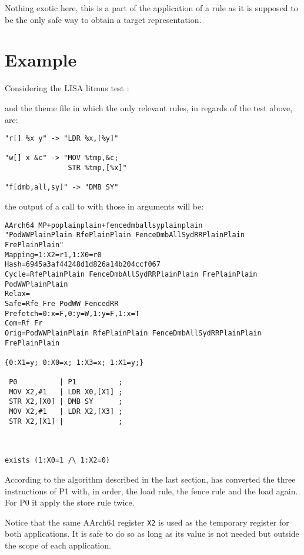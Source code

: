 Nothing exotic here, this is a part of the application of a rule as it is supposed
to be the only safe way to obtain a target representation.

\section{Example}

Considering the LISA litmus test
:

 

and the theme file  in which the
only relevant rules, in regards of the test above, are:

\begin{verbatim}
"r[] %x y" -> "LDR %x,[%y]"

"w[] x &c" -> "MOV %tmp,&c;
               STR %tmp,[%x]"

"f[dmb,all,sy]" -> "DMB SY"
\end{verbatim}

the output of a call to \jingle{} with those in arguments will be:
\begin{verbatim}
AArch64 MP+poplainplain+fencedmballsyplainplain
"PodWWPlainPlain RfePlainPlain FenceDmbAllSydRRPlainPlain FrePlainPlain"
Mapping=1:X2=r1,1:X0=r0
Hash=6945a3af44248d1d826a14b204ccf067
Cycle=RfePlainPlain FenceDmbAllSydRRPlainPlain FrePlainPlain PodWWPlainPlain
Relax=
Safe=Rfe Fre PodWW FencedRR
Prefetch=0:x=F,0:y=W,1:y=F,1:x=T
Com=Rf Fr
Orig=PodWWPlainPlain RfePlainPlain FenceDmbAllSydRRPlainPlain FrePlainPlain

{0:X1=y; 0:X0=x; 1:X3=x; 1:X1=y;}

 P0          | P1          ;
 MOV X2,#1   | LDR X0,[X1] ;
 STR X2,[X0] | DMB SY      ;
 MOV X2,#1   | LDR X2,[X3] ;
 STR X2,[X1] |             ;



exists (1:X0=1 /\ 1:X2=0)
\end{verbatim}

According to the algorithm described in the last section,
\jingle{} has converted the three instructions of P1 with,
in order, the load rule, the fence rule and the load again.
For P0 it apply the store rule twice.

Notice that the same AArch64 register \verb+X2+ is used as
the temporary register for both applications. It is safe to do so
as long as  its value is not needed but outside the scope
of each application.

